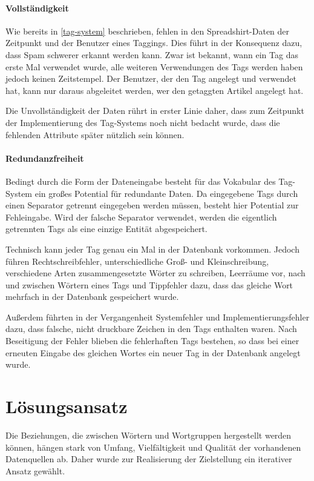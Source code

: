 \paragraph{Vollständigkeit}

Wie bereits in \ref{tag-system} beschrieben, fehlen in den Spreadshirt-Daten der Zeitpunkt und der Benutzer eines Taggings. Dies führt in der Konsequenz dazu, dass Spam schwerer erkannt werden kann. Zwar ist bekannt, wann ein Tag das erste Mal verwendet wurde, alle weiteren Verwendungen des Tags werden haben jedoch keinen Zeitstempel. Der Benutzer, der den Tag angelegt und verwendet hat, kann nur daraus abgeleitet werden, wer den getaggten Artikel angelegt hat.

Die Unvollständigkeit der Daten rührt in erster Linie daher, dass zum Zeitpunkt der Implementierung des Tag-Systems noch nicht bedacht wurde, dass die fehlenden Attribute später nützlich sein können.

\paragraph{Redundanzfreiheit}

Bedingt durch die Form der Dateneingabe besteht für das Vokabular des Tag-System ein großes Potential für redundante Daten. Da eingegebene Tags durch einen Separator getrennt eingegeben werden müssen, besteht hier Potential zur Fehleingabe. Wird der falsche Separator verwendet, werden die eigentlich getrennten Tags als eine einzige Entität abgespeichert.

Technisch kann jeder Tag genau ein Mal in der Datenbank vorkommen. Jedoch führen Rechtschreibfehler, unterschiedliche Groß- und Kleinschreibung, verschiedene Arten zusammengesetzte Wörter zu schreiben, Leerräume vor, nach und zwischen Wörtern eines Tags und Tippfehler dazu, dass das gleiche Wort mehrfach in der Datenbank gespeichert wurde.

Außerdem führten in der Vergangenheit Systemfehler und Implementierungsfehler dazu, dass falsche, nicht druckbare Zeichen in den Tags enthalten waren. Nach Beseitigung der Fehler blieben die fehlerhaften Tags bestehen, so dass bei einer erneuten Eingabe des gleichen Wortes ein neuer Tag in der Datenbank angelegt wurde.

\section{Lösungsansatz}
\label{solution}

Die Beziehungen, die zwischen Wörtern und Wortgruppen hergestellt werden können, hängen stark von Umfang, Vielfältigkeit und Qualität der vorhandenen Datenquellen ab. Daher wurde zur Realisierung der Zielstellung ein iterativer Ansatz gewählt.

